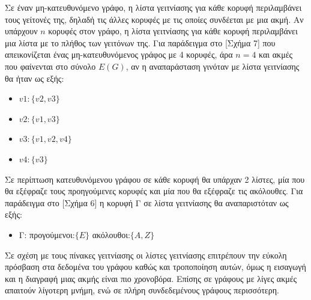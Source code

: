  Σε έναν μη-κατευθυνόμενο γράφο, η λίστα γειτνίασης για κάθε κορυφή περιλαμβάνει τους γείτονές της, δηλαδή τις άλλες κορυφές με τις οποίες συνδέεται με μια ακμή. Αν υπάρχουν $n$ κορυφές στον γράφο, η λίστα γειτνίασης για κάθε κορυφή περιλαμβάνει μια λίστα με το πλήθος των γειτόνων της. Για παράδειγμα στο [Σχήμα 7] που απεικονίζεται ένας μη-κατευθυνόμενος γράφος με 4 κορυφές, άρα $n=4$ και ακμές που φαίνενται στο σύνολο $E(G)$, αν η αναπαράσταση γινόταν με λίστα γειτνίασης θα ήταν ως εξής: 
\begin{itemize}
    \item $v1: \{v2, v3\}$
    \item $v2: \{v1, v3\}$
    \item $v3: \{v1, v2, v4\}$
    \item $v4: \{v3\}$
\end{itemize}

Σε περίπτωση κατευθυνόμενου γράφου σε κάθε κορυφή θα υπάρχαν 2 λίστες, μία που θα εξέφραζε τους προηγούμενες κορυφές και μία που θα εξέφραζε τις ακόλουθες. Για παράδειγμα στο [Σχήμα 6] η κορυφή Γ σε λίστα γειτνίασης θα αναπαριστόταν ως εξής: 
\begin{itemize}
    \item Γ: προγούμενοι:$\{E\}$ ακόλουθοι:$\{A, Z\}$
\end{itemize}

Σε σχέση με τους πίνακες γειτνίασης οι λίστες γειτνίασης επιτρέπουν την εύκολη πρόσβαση στα δεδομένα του γράφου καθώς και τροποποίηση αυτών, όμως η εισαγωγή και η διαγραφή μιας ακμής είναι πιο χρονοβόρα. Επίσης σε γράφους με λίγες ακμές απαιτούν λίγοτερη μνήμη, ενώ σε πλήρη συνδεδεμένους γράφους περισσότερη. 
